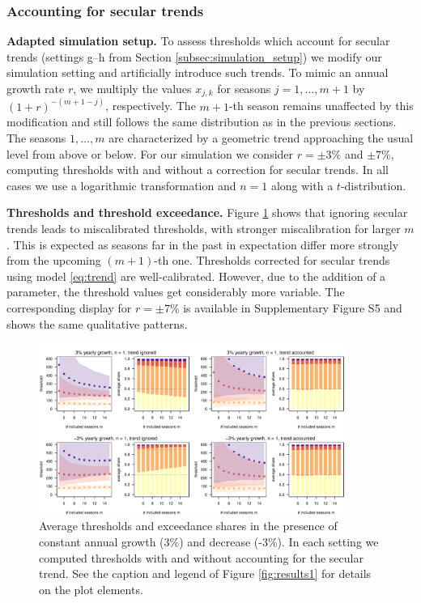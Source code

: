 \documentclass[12pt]{article}
\begin{document}
\subsubsection{Accounting for secular trends}
\label{subsec:results_trends}

\textbf{Adapted simulation setup.} To assess thresholds which account for secular trends (settings g--h from Section \ref{subsec:simulation_setup}) we modify our simulation setting and artificially introduce such trends. To mimic an annual growth rate $r$, we multiply the values $x_{j, k}$ for seasons $j = 1, \dots, m + 1$ by $(1 + r)^{-(m + 1 - j)}$, respectively. The $m + 1$-th season remains unaffected by this modification and still follows the same distribution as in the previous sections. The seasons $1, \dots, m$ are characterized by a geometric trend approaching the usual level from above or below. For our simulation we consider $r = \pm 3\%$ and $\pm 7\%$, computing thresholds with and without a correction for secular trends. In all cases we use a logarithmic transformation and $n = 1$ along with a $t$-distribution.

\noindent \textbf{Thresholds and threshold exceedance.} Figure \ref{fig:trend} shows that ignoring secular trends leads to miscalibrated thresholds, with stronger miscalibration for larger $m$. This is expected as seasons far in the past in expectation differ more strongly from the upcoming $(m + 1)$-th one. Thresholds corrected for secular trends using model \eqref{eq:trend} are well-calibrated. However, due to the addition of a parameter, the threshold values get considerably more variable. The corresponding display for $r = \pm 7\%$ is available in Supplementary Figure S5 and shows the same qualitative patterns.

\begin{figure}
\begin{center}
\includegraphics[width = 0.9\textwidth]{figure/plot_trend3_fr_small.pdf}\vspace{-5mm}
\end{center}
\caption{Average thresholds and exceedance shares in the presence of constant annual growth (3\%) and decrease (-3\%). In each setting we computed thresholds with and without accounting for the secular trend. See the caption and legend of Figure \ref{fig:results1} for details on the plot elements.}
\label{fig:trend}
\end{figure}
\end{document}

